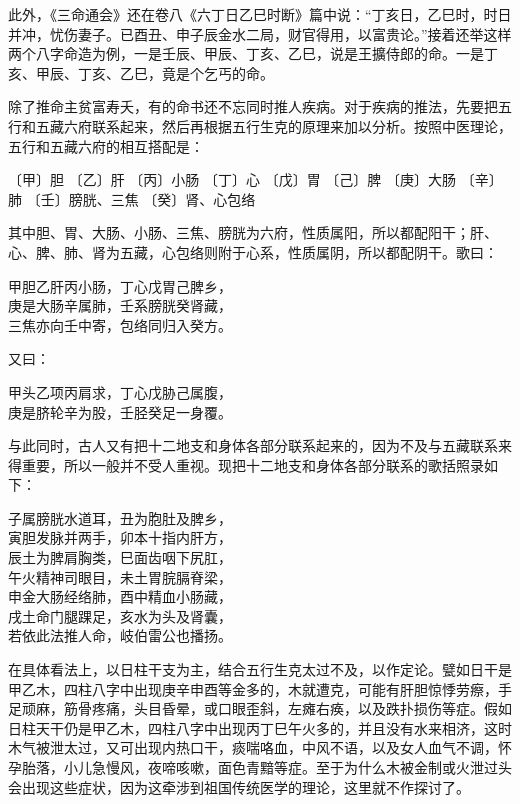 \documentclass[a5paper,oneside,12pt]{ctexbook}
\newenvironment{tightcenter}{%
  \setlength\topsep{0pt}
  \setlength\parskip{0pt}
  \begin{center}\kaishu 
}{%
  \end{center}
}
\begin{document}
此外，《三命通会》还在卷八《六丁日乙巳时断》篇中说：“丁亥日，乙巳时，时日并冲，忧伤妻子。已酉丑、申子辰金水二局，财官得用，以富贵论。”接着还举这样两个八字命造为例，一是壬辰、甲辰、丁亥、乙巳，说是王擴侍郎的命。一是丁亥、甲辰、丁亥、乙巳，竟是个乞丐的命。

除了推命主贫富寿夭，有的命书还不忘同时推人疾病。对于疾病的推法，先要把五行和五藏六府联系起来，然后再根据五行生克的原理来加以分析。按照中医理论，五行和五藏六府的相互搭配是：

〔甲〕胆	〔乙〕肝
〔丙〕小肠	〔丁〕心
〔戊〕胃 〔己〕脾
〔庚〕大肠	〔辛〕肺
〔壬〕膀胱、三焦	〔癸〕肾、心包络

其中胆、胃、大肠、小肠、三焦、膀胱为六府，性质属阳，所以都配阳干；肝、心、脾、肺、肾为五藏，心包络则附于心系，性质属阴，所以都配阴干。歌曰：
\begin{tightcenter}
甲胆乙肝丙小肠，丁心戊胃己脾乡，\\
庚是大肠辛属肺，壬系膀胱癸肾藏，\\
三焦亦向壬中寄，包络同归入癸方。
\end{tightcenter}

又曰：
\begin{tightcenter}
甲头乙项丙肩求，丁心戊胁己属腹，\\
庚是脐轮辛为股，壬胫癸足一身覆。
\end{tightcenter}

与此同时，古人又有把十二地支和身体各部分联系起来的，因为不及与五藏联系来得重要，所以一般并不受人重视。现把十二地支和身体各部分联系的歌括照录如下：
\begin{tightcenter}
子属膀胱水道耳，丑为胞肚及脾乡，\\
寅胆发脉并两手，卯本十指内肝方，\\
辰土为脾肩胸类，巳面齿咽下尻肛，\\
午火精神司眼目，未土胃脘膈脊梁，\\
申金大肠经络肺，酉中精血小肠藏，\\
戌土命门腿踝足，亥水为头及肾囊，\\
若依此法推人命，岐伯雷公也播扬。
\end{tightcenter}

在具体看法上，以日柱干支为主，结合五行生克太过不及，以作定论。甓如日干是甲乙木，四柱八字中出现庚辛申酉等金多的，木就遭克，可能有肝胆惊悸劳瘵，手足顽麻，筋骨疼痛，头目昏晕，或口眼歪斜，左瘫右痪，以及跌扑损伤等症。假如日柱天干仍是甲乙木，四柱八字中出现丙丁巳午火多的，并且没有水来相济，这时木气被泄太过，又可出现内热口干，痰喘咯血，中风不语，以及女人血气不调，怀孕胎落，小儿急慢风，夜啼咳嗽，面色青黯等症。至于为什么木被金制或火泄过头会出现这些症状，因为这牵涉到祖国传统医学的理论，这里就不作探讨了。
\end{document}

